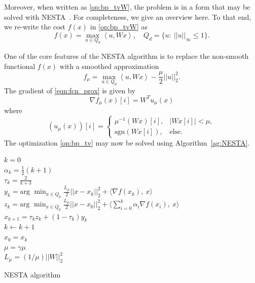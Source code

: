 \documentclass[twocolumn,oneside]{IEEEtran/IEEEtran}
\begin{document}
Moreover, when written as \eqref{op:bp_tvW}, the problem is in a form that may be solved with NESTA~\cite{becker_nesta_2011}. For completeness, we give an overview here.
To that end, we re-write the cost $f(x)$ in \eqref{op:bp_tvW} as
\begin{equation*}
  f(x) = \max_{u\in Q_d} \left\langle u, Wx \right\rangle,\quad Q_d = \{u:~||u||_{\infty} \leq 1\}.
\end{equation*}

One of the core features of the NESTA algorithm is to replace the non-smooth functional $f(x)$ with a smoothed approximation
\begin{equation}
  f_{\mu} = \max_{u\in Q_d} \left\langle u,
    W x \right\rangle - \frac{\mu}{2}||u||_2^2. \label{eqn:fcn_prox}
\end{equation}
The gradient of \eqref{eqn:fcn_prox} is given by
\begin{equation*}
  \nabla f_{\mu}(x)[i] = W^Tu_{\mu}(x)
\end{equation*}
where
\begin{equation*}
  (u_{\mu}(x))[i] = 
\begin{cases}
    \mu^{-1}(Wx)[i], & |W x[i]| < \mu,\\
    \text{sgn}(W x[i]), & \text{else}.
  \end{cases}
\end{equation*}
The optimization \eqref{op:bp_tv} may now be solved using Algorithm~\ref{ag:NESTA}.

\begin{algorithm}
   
		
   {
    $k=0$\\
       {
        $\alpha_k = \frac{1}{2}(k+1)$ \\
        $\tau_k = \frac{2}{k+3}$ \\
        $\displaystyle y_k = \text{arg } \min_{x\in Q_p}
          \frac{L_{\mu}}{2}||x - x_k||_2^2 + \langle \nabla f(x_k),~ x\rangle$\\
        $\displaystyle {z_k = \text{arg } \min_{x\in Q_p} \frac{L_{\mu}}{2}||x-x_0||_2^2 +
        \langle \sum_{i=0}^k \alpha_i \nabla f(x_i), ~x \rangle}$\\
        $x_{k+1} = \tau_kz_k + (1-\tau_k)y_k$\\
        $k \leftarrow k + 1$\\
      }
      $x_0 = x_k$\\
      $\mu = \gamma \mu$\\
      $L_{\mu} = (1/\mu)||W||^2_2$
    }
  \caption{NESTA algorithm}
  \label{ag:NESTA}
\end{algorithm}
\end{document}
